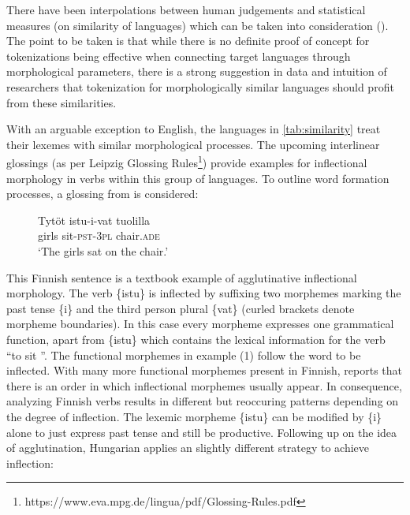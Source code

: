 There have been interpolations between human judgements and statistical measures (on similarity of languages) which can be taken into consideration (\cite{bentz-etal-2016-comparison}).
The point to be taken is that while there is no definite proof of concept for tokenizations being effective when connecting target languages through morphological parameters, there is a strong suggestion in data and intuition of researchers that tokenization for morphologically similar languages should profit from these similarities.

With an arguable exception to English, the languages in \autoref{tab:similarity} treat their lexemes with similar morphological processes.
The upcoming interlinear glossings (as per Leipzig Glossing Rules\footnote{https://www.eva.mpg.de/lingua/pdf/Glossing-Rules.pdf}) provide examples for inflectional morphology in verbs within this group of languages.
To outline word formation processes, a glossing from \textcite[71]{finverbs} is considered:

\begin{figure}[h]
\centering
    \label{fig:fin}
    \begin{exe}
        \ex
        \gll  Tytöt istu-i-vat tuolilla \\
            girls sit-\textsc{pst}-3\textsc{pl} chair.\textsc{ade}\\
        \glt  `The girls sat on the chair.'
    \end{exe}
\end{figure}

This Finnish sentence is a textbook example of agglutinative inflectional morphology.
The verb \{istu\} is inflected by suffixing two morphemes marking the past tense \{i\} and the third person plural \{vat\} (curled brackets denote morpheme boundaries).
In this case every morpheme expresses one grammatical function, apart from \{istu\} which contains the lexical information for the verb \textquotedblleft to sit \textquotedblright.
The functional morphemes in example (1) follow the word to be inflected.
With many more functional morphemes present in Finnish, \citeauthor{finverbs} reports that there is an order in which inflectional morphemes usually appear.
In consequence, analyzing Finnish verbs results in different but reoccuring patterns depending on the degree of inflection.
The lexemic morpheme \{istu\} can be modified by \{i\} alone to just express past tense and still be productive.
Following up on the idea of agglutination, Hungarian applies an slightly different strategy to achieve inflection:

